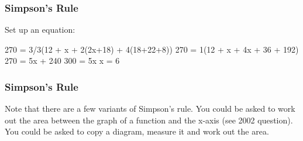 \documentclass{beamer}
\begin{document}
\begin{frame}[fragile]
	\frametitle{Simpson's Rule}
	\Large

Set up an equation:

270 = 3/3(12 + x + 2(2x+18) + 4(18+22+8))
270 = 1(12 + x + 4x + 36 + 192)
270 = 5x + 240
300 = 5x
x = 6
\end{frame}
\begin{frame}[fragile]
	\frametitle{Simpson's Rule}
	\Large

Note that there are a few variants of Simpson's rule.
You could be asked to work out the area between the graph of a function and the x-axis (see 2002 question).
You could be asked to copy a diagram, measure it and work out the area. 
\end{frame}
\end{document}
